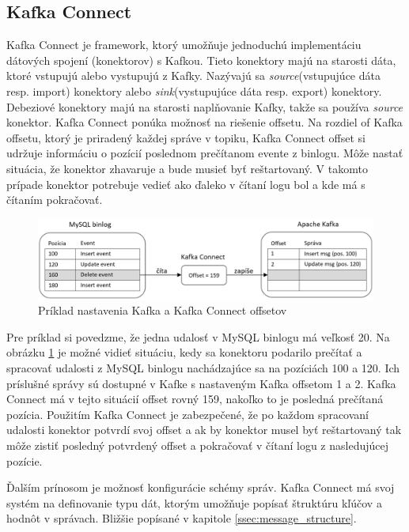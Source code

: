 \subsection{Kafka Connect}\label{kafka_connect}
Kafka Connect je framework, ktorý umožňuje jednoduchú implementáciu dátových spojení (konektorov) s Kafkou. Tieto konektory majú na starosti dáta, ktoré vstupujú alebo vystupujú z Kafky. Nazývajú sa \textit{source}(vstupujúce dáta resp. import) konektory alebo \textit{sink}(vystupujúce dáta resp. export) konektory. Debeziové konektory majú na starosti naplňovanie Kafky, takže sa používa \textit{source} konektor. Kafka Connect ponúka možnosť na riešenie offsetu. Na rozdiel of Kafka offsetu, ktorý je priradený každej správe v topiku, Kafka Connect offset si udržuje informáciu o pozícií poslednom prečítanom evente z binlogu. Môže nastať situácia, že konektor zhavaruje a bude musieť byť reštartovaný. V takomto prípade konektor potrebuje vedieť ako ďaleko v čítaní logu bol a kde má s čítaním pokračovať. 

\begin{figure}[H]
\begin{center}
\includegraphics[width=15cm]{figures/kafka_offsets.PNG}
\caption{Príklad nastavenia Kafka a Kafka Connect offsetov}
\label{fig:kafka_offsets}
\end{center}
\end{figure}

Pre príklad si povedzme, že jedna udalosť v MySQL binlogu má veľkosť 20. Na obrázku \ref{fig:kafka_offsets} je možné vidieť situáciu, kedy sa konektoru podarilo prečítať a spracovať udalosti z MySQL binlogu nachádzajúce sa na pozíciách 100 a 120. Ich príslušné správy sú dostupné v Kafke s nastaveným Kafka offsetom 1 a 2. Kafka Connect má v tejto situácií offset rovný 159, nakoľko to je posledná prečítaná pozícia. Použitím Kafka Connect je zabezpečené, že po každom spracovaní udalosti konektor potvrdí svoj offset a ak by konektor musel byť reštartovaný tak môže zistiť posledný potvrdený offset a pokračovať v čítaní logu z nasledujúcej pozície.

Ďalším prínosom je možnosť konfigurácie schémy správ. Kafka Connect má svoj systém na definovanie typu dát, ktorým umožňuje popísať štruktúru kľúčov a hodnôt v správach. Bližšie popísané v kapitole \ref{ssec:message_structure}.

